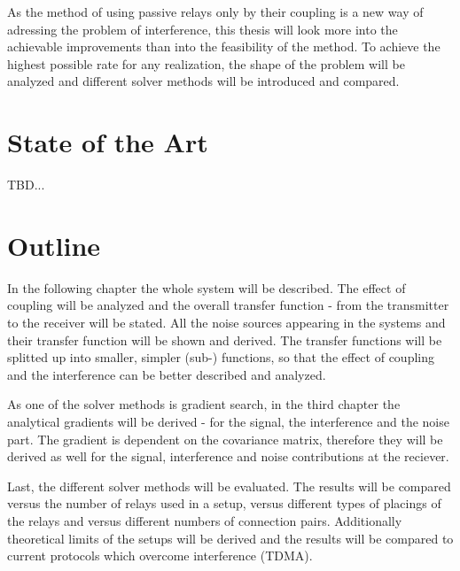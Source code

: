 As the method of using passive relays only by their coupling is a new way of adressing the problem of interference, this thesis will look more into the achievable improvements than into the feasibility of the method.
To achieve the highest possible rate for any realization, the shape of the problem will be analyzed and different solver methods will be introduced and compared.


\section{State of the Art}
\label{sec:SoA}

TBD...

\cite{Nossek}
\cite{Yahia2013}
\cite{rusek13}



\section{Outline}
\label{sec:outline}

In the following chapter the whole system will be described.
The effect of coupling will be analyzed and the overall transfer function - from the transmitter to the receiver will be stated.
All the noise sources appearing in the systems and their transfer function will be shown and derived.
The transfer functions will be splitted up into smaller, simpler (sub-) functions, so that the effect of coupling and the interference can be better described and analyzed.

As one of the solver methods is gradient search, in the third chapter the analytical gradients will be derived - for the signal, the interference and the noise part.
The gradient is dependent on the covariance matrix, therefore they will be derived as well for the signal, interference and noise contributions at the reciever.

Last, the different solver methods will be evaluated.
The results will be compared versus the number of relays used in a setup,
versus different types of placings of the relays and versus different numbers of connection pairs.
Additionally theoretical limits of the setups will be derived and the results will be compared to current protocols which overcome interference (TDMA).








